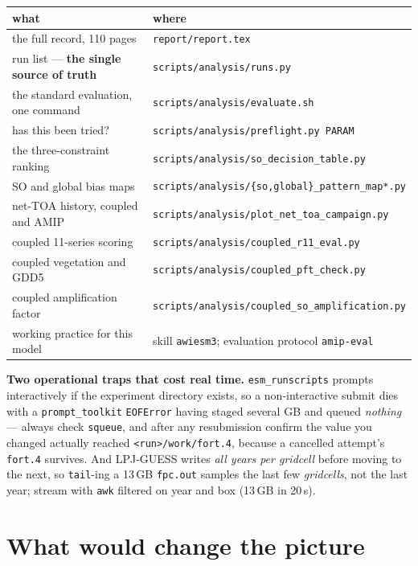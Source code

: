 \documentclass[10pt]{article}
\begin{document}
\begin{center}\footnotesize
\begin{tabular}{l l}
\toprule
what & where \\
\midrule
the full record, 110 pages & \texttt{report/report.tex} \\
run list --- \textbf{the single source of truth} & \texttt{scripts/analysis/runs.py} \\
the standard evaluation, one command & \texttt{scripts/analysis/evaluate.sh} \\
has this been tried? & \texttt{scripts/analysis/preflight.py PARAM} \\
the three-constraint ranking & \texttt{scripts/analysis/so\_decision\_table.py} \\
SO and global bias maps & \texttt{scripts/analysis/\{so,global\}\_pattern\_map*.py} \\
net-TOA history, coupled and AMIP & \texttt{scripts/analysis/plot\_net\_toa\_campaign.py} \\
coupled 11-series scoring & \texttt{scripts/analysis/coupled\_r11\_eval.py} \\
coupled vegetation and GDD5 & \texttt{scripts/analysis/coupled\_pft\_check.py} \\
coupled amplification factor & \texttt{scripts/analysis/coupled\_so\_amplification.py} \\
working practice for this model & skill \texttt{awiesm3}; evaluation protocol \texttt{amip-eval} \\
\bottomrule
\end{tabular}
\end{center}

\textbf{Two operational traps that cost real time.} \texttt{esm\_runscripts} prompts
interactively if the experiment directory exists, so a non-interactive submit dies with a
\texttt{prompt\_toolkit} \texttt{EOFError} having staged several GB and queued
\emph{nothing} --- always check \texttt{squeue}, and after any resubmission confirm the
value you changed actually reached \texttt{<run>/work/fort.4}, because a cancelled
attempt's \texttt{fort.4} survives. And LPJ-GUESS writes \emph{all years per gridcell}
before moving to the next, so \texttt{tail}-ing a 13\,GB \texttt{fpc.out} samples the last
few \emph{gridcells}, not the last year; stream with \texttt{awk} filtered on year and box
(13\,GB in 20\,s).

\section{What would change the picture}\label{sec:falsifiers}
\end{document}
